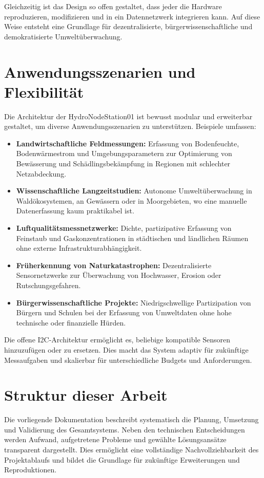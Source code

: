Gleichzeitig ist das Design so offen gestaltet, dass jeder die Hardware reproduzieren, modifizieren und in ein Datennetzwerk integrieren kann. Auf diese Weise entsteht eine Grundlage für dezentralisierte, bürgerwissenschaftliche und demokratisierte Umweltüberwachung.

\newpage

\section*{Anwendungsszenarien und Flexibilität}

Die Architektur der HydroNodeStation01 ist bewusst modular und erweiterbar gestaltet, um diverse Anwendungsszenarien zu unterstützen. Beispiele umfassen:

\begin{itemize}
  \item \textbf{Landwirtschaftliche Feldmessungen:} Erfassung von Bodenfeuchte, Bodenwärmestrom und Umgebungsparametern zur Optimierung von Bewässerung und Schädlingsbekämpfung in Regionen mit schlechter Netzabdeckung.
  
  \item \textbf{Wissenschaftliche Langzeitstudien:} Autonome Umweltüberwachung in Waldökosystemen, an Gewässern oder in Moorgebieten, wo eine manuelle Datenerfassung kaum praktikabel ist.
  
  \item \textbf{Luftqualitätsmessnetzwerke:} Dichte, partizipative Erfassung von Feinstaub und Gaskonzentrationen in städtischen und ländlichen Räumen ohne externe Infrastrukturabhängigkeit.
  
  \item \textbf{Früherkennung von Naturkatastrophen:} Dezentralisierte Sensornetzwerke zur Überwachung von Hochwasser, Erosion oder Rutschungsgefahren.
  
  \item \textbf{Bürgerwissenschaftliche Projekte:} Niedrigschwellige Partizipation von Bürgern und Schulen bei der Erfassung von Umweltdaten ohne hohe technische oder finanzielle Hürden.
\end{itemize}

Die offene I2C-Architektur ermöglicht es, beliebige kompatible Sensoren hinzuzufügen oder zu ersetzen. Dies macht das System adaptiv für zukünftige Messaufgaben und skalierbar für unterschiedliche Budgets und Anforderungen.

\section*{Struktur dieser Arbeit}

Die vorliegende Dokumentation beschreibt systematisch die Planung, Umsetzung und Validierung des Gesamtsystems. Neben den technischen Entscheidungen werden Aufwand, aufgetretene Probleme und gewählte Lösungsansätze transparent dargestellt. Dies ermöglicht eine vollständige Nachvollziehbarkeit des Projektablaufs und bildet die Grundlage für zukünftige Erweiterungen und Reproduktionen.
